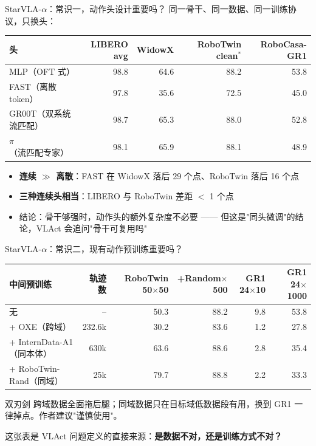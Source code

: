 \documentclass[aspectratio=169,10pt]{beamer}
\newcommand{\con}[1]{\textcolor{negative}{#1}}
\newcommand{\HL}[1]{\textcolor{emphasis}{#1}}
\newcommand{\mute}[1]{\textcolor{neutral}{#1}}
\begin{document}
\begin{frame}{StarVLA-$\alpha$：常识一，动作头设计重要吗？}
  同一骨干、同一数据、同一训练协议，只换头：
  \vspace{4pt}
  \begin{center}\small
  \begin{tabular}{lrrrr}
    \toprule
    头 & LIBERO avg & WidowX & RoboTwin clean$^*$ & RoboCasa-GR1 \\
    \midrule
    MLP（OFT 式） & 98.8 & 64.6 & 88.2 & \HL{53.8} \\
    FAST（离散 token） & 97.8 & \con{35.6} & \con{72.5} & 45.0 \\
    GR00T（双系统流匹配） & 98.7 & 65.3 & 88.0 & 52.8 \\
    $\pi$（流匹配专家） & 98.1 & 65.9 & 88.1 & 48.9 \\
    \bottomrule
  \end{tabular}
  \end{center}
  \vspace{6pt}
  \begin{itemize}
    \item \textbf{连续 $\gg$ 离散}：FAST 在 WidowX 落后 29 个点、RoboTwin 落后 16 个点
    \item \textbf{三种连续头相当}：LIBERO 与 RoboTwin 差距 $<$ 1 个点
    \item 结论：骨干够强时，动作头的额外复杂度不必要 —— \mute{但这是"同头微调"的结论，VLAct 会追问"骨干可复用吗"}
  \end{itemize}
\end{frame}

\begin{frame}{StarVLA-$\alpha$：常识二，现有动作预训练重要吗？}
  \begin{center}\small
  \begin{tabular}{lrrrrr}
    \toprule
    中间预训练 & 轨迹数 & RoboTwin 50$\times$50 & +Random$\times$500 & GR1 24$\times$10 & GR1 24$\times$1000 \\
    \midrule
    无 & – & 50.3 & 88.2 & 9.8 & 53.8 \\
    + OXE（跨域） & 232.6k & \con{30.2} & 83.6 & \con{1.2} & \con{27.8} \\
    + InternData-A1（同本体） & 630k & \HL{63.6} & 88.6 & 2.8 & 35.4 \\
    + RoboTwin-Rand（同域） & 25k & \HL{79.7} & 88.8 & 2.2 & 33.3 \\
    \bottomrule
  \end{tabular}
  \end{center}
  \vspace{6pt}
  \begin{alertblock}{双刃剑}
    跨域数据全面拖后腿；同域数据只在目标域低数据段有用，换到 GR1 一律掉点。作者建议"谨慎使用"。
  \end{alertblock}
  \vspace{4pt}
  这张表是 VLAct 问题定义的直接来源：\textbf{是数据不对，还是训练方式不对？}
\end{frame}
\end{document}
